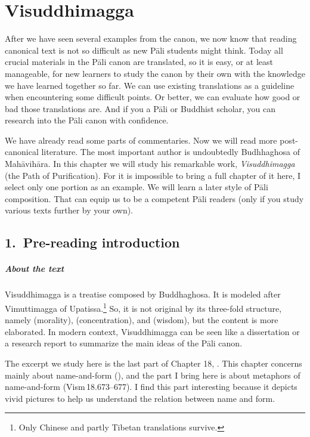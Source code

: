 \chapter{Visuddhimagga}\label{chap:vism}

After we have seen several examples from the canon, we now know that reading canonical text is not so difficult as new P\=ali students might think. Today all crucial materials in the P\=ali canon are translated, so it is easy, or at least manageable, for new learners to study the canon by their own with the knowledge we have learned together so far. We can use existing translations as a guideline when encountering some difficult points. Or better, we can evaluate how good or bad those translations are. And if you a P\=ali or Buddhist scholar, you can research into the P\=ali canon with confidence.

We have already read some parts of commentaries. Now we will read more post-canonical literature. The most important author is undoubtedly Budhhaghosa of Mah\=avih\=ara. In this chapter we will study his remarkable work, \emph{Visuddhimagga} (the Path of Purification). For it is impossible to bring a full chapter of it here, I select only one portion as an example. We will learn a later style of P\=ali composition. That can equip us to be a competent P\=ali readers (only if you study various texts further by your own).

{}
\section*{1.\ Pre-reading introduction}

\paragraph*{About the text} Visuddhimagga is a treatise composed by Buddhaghosa. It is modeled after Vimuttimagga of Upatissa.\footnote{Only Chinese and partly Tibetan translations survive.} So, it is not original by its three-fold structure, namely  (morality),  (concentration), and  (wisdom), but the content is more elaborated. In modern context, Visuddhimagga can be seen like a dissertation or a research report to summarize the main ideas of the P\=ali canon.

The excerpt we study here is the last part of Chapter 18, . This chapter concerns mainly about name-and-form (), and the part I bring here is about metaphors of name-and-form (Vism\,18.673--677). I find this part interesting because it depicts vivid pictures to help us understand the relation between name and form.

